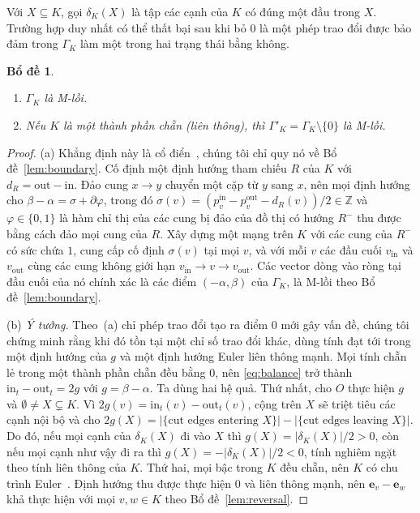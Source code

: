 \documentclass[pdflatex,sn-mathphys-num]{sn-jnl}
\theoremstyle{thmstyleone}
\newtheorem{lemma}[theorem]{Bổ đề}
\theoremstyle{thmstyletwo}
\theoremstyle{thmstylethree}
\newcommand{\Z}{\mathbb{Z}}
\newcommand{\e}{\mathbf{e}}
\newcommand{\out}{\mathrm{out}}
\newcommand{\inn}{\mathrm{in}}
\begin{document}
Với $X\subseteq K$, gọi $\delta_K(X)$ là tập các cạnh của $K$ có đúng một đầu trong $X$. Trường hợp duy nhất có thể thất bại sau khi bỏ $0$ là một phép trao đổi được bảo đảm trong $\Gamma_K$ làm một trong hai trạng thái bằng không.

\begin{lemma}\label{lem:gamma}
\begin{enumerate}
\item[(a)] $\Gamma_K$ là M-lồi.
\item[(b)] Nếu $K$ là một thành phần chẵn (liên thông), thì $\Gamma'_K=\Gamma_K\setminus\{0\}$ là M-lồi.
\end{enumerate}
\end{lemma}

\begin{proof}
(a) Khẳng định này là cổ điển~\cite{hakimi1965,frank1980,frank2011}, chúng tôi chỉ quy nó về Bổ đề~\ref{lem:boundary}. Cố định một định hướng tham chiếu $R$ của $K$ với $d_R=\out-\inn$. Đảo cung $x\to y$ chuyển một cặp từ $y$ sang $x$, nên mọi định hướng cho $\beta-\alpha=\sigma+\partial\varphi$, trong đó $\sigma(v)=(p^{\inn}_v-p^{\out}_v-d_R(v))/2\in\Z$ và $\varphi\in\{0,1\}$ là hàm chỉ thị của các cung bị đảo của đồ thị có hướng $R^-$ thu được bằng cách đảo mọi cung của $R$. Xây dựng một mạng trên $K$ với các cung của $R^-$ có sức chứa $1$, cung cấp cố định $\sigma(v)$ tại mọi $v$, và với mỗi $v$ các đầu cuối $v_{\inn}$ và $v_{\out}$ cùng các cung không giới hạn $v_{\inn}\to v\to v_{\out}$. Các vector dòng vào ròng tại đầu cuối của nó chính xác là các điểm $(-\alpha,\beta)$ của $\Gamma_K$, là M-lồi theo Bổ đề~\ref{lem:boundary}.

(b) \emph{Ý tưởng.} Theo~(a) chỉ phép trao đổi tạo ra điểm $0$ mới gây vấn đề, chúng tôi chứng minh rằng khi đó tồn tại một chỉ số trao đổi khác, dùng tính đạt tới trong một định hướng của $g$ và một định hướng Euler liên thông mạnh. Mọi tính chẵn lẻ trong một thành phần chẵn đều bằng $0$, nên \eqref{eq:balance} trở thành $\inn_t-\out_t=2g$ với $g=\beta-\alpha$. Ta dùng hai hệ quả. Thứ nhất, cho $O$ thực hiện $g$ và $\emptyset\ne X\subsetneq K$. Vì $2g(v)=\inn_t(v)-\out_t(v)$, cộng trên $X$ sẽ triệt tiêu các cạnh nội bộ và cho $2g(X)=|\{\text{cut edges entering }X\}|-|\{\text{cut edges leaving }X\}|$. Do đó, nếu mọi cạnh của $\delta_K(X)$ đi vào $X$ thì $g(X)=|\delta_K(X)|/2>0$, còn nếu mọi cạnh như vậy đi ra thì $g(X)=-|\delta_K(X)|/2<0$, tính nghiêm ngặt theo tính liên thông của $K$. Thứ hai, mọi bậc trong $K$ đều chẵn, nên $K$ có chu trình Euler~\cite{hierholzer1873}. Định hướng thu được thực hiện $0$ và liên thông mạnh, nên $\e_v-\e_w$ khả thực hiện với mọi $v,w\in K$ theo Bổ đề~\ref{lem:reversal}.


\end{proof}
\end{document}
